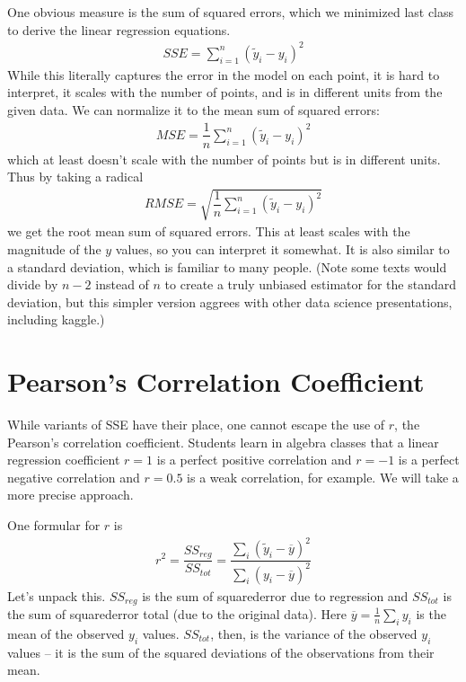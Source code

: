 \documentclass[letterpaper,10pt,english]{jupyterBook}
\begin{document}
\sphinxAtStartPar
One obvious measure is the sum of squared errors, which we minimized last class to derive the linear regression equations.
\begin{equation*}
\begin{split}SSE = \sum_{i=1}^n (\tilde{y}_i - y_i)^2\end{split}
\end{equation*}
\sphinxAtStartPar
While this literally captures the error in the model on each point, it is hard to interpret, it scales with the number of points, and is in different units from the given data. We can normalize it to the mean sum of squared errors:
\begin{equation*}
\begin{split}MSE = \dfrac{1}{n}\sum_{i=1}^n (\tilde{y}_i - y_i)^2\end{split}
\end{equation*}
\sphinxAtStartPar
which at least doesn’t scale with the number of points but is in different units. Thus by taking a radical
\begin{equation*}
\begin{split}RMSE = \sqrt{\dfrac{1}{n}\sum_{i=1}^n (\tilde{y}_i - y_i)^2}\end{split}
\end{equation*}
\sphinxAtStartPar
we get the root mean sum of squared errors. This at least scales with the magnitude of the \(y\) values, so you can interpret it somewhat. It is also similar
to a standard deviation, which is familiar to many people. (Note some texts would divide by \(n-2\) instead of \(n\) to create a truly unbiased
estimator for the standard deviation, but this simpler version aggrees with other data science presentations, including kaggle.)


\section{Pearson’s Correlation Coefficient}
\label{\detokenize{lessons/Correlation_Coefficient:pearson-s-correlation-coefficient}}
\sphinxAtStartPar
While variants of SSE have their place, one cannot escape the use of \(r\), the Pearson’s correlation coefficient. Students learn in algebra classes
that a linear regression coefficient \(r=1\) is a perfect positive correlation and \(r=-1\) is a perfect negative correlation and \(r=0.5\) is a weak
correlation, for example. We will take a more precise approach.

\sphinxAtStartPar
One formular for \(r\) is
\begin{equation*}
\begin{split}r^2 = \dfrac{SS_{reg}}{SS_{tot}} = \dfrac{\sum_i(\tilde{y}_i - \overline{y})^2} {\sum_i(y_i - \overline{y})^2}\end{split}
\end{equation*}
\sphinxAtStartPar
Let’s unpack this. \(SS_{reg}\) is the sum of squared\sphinxhyphen{}error due to regression and \(SS_{tot}\) is the sum of squared\sphinxhyphen{}error total (due to the original data).
Here \(\overline{y} = \frac1n\sum_i y_i\) is the mean of the observed \(y_i\) values. \(SS_{tot}\), then, is the variance of the observed \(y_i\) values – it is the
sum of the squared deviations of the observations from their mean.
\end{document}
